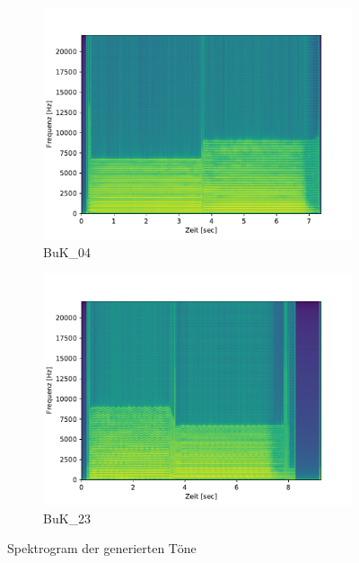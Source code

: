 \begin{figure}[H]
    \centering
    \begin{subfigure}{.5\textwidth}
        \centering
        \caption{BuK\_04}
        \includegraphics[width=\linewidth]{Figures/buk04_spectrogram}
    \end{subfigure}%
    \begin{subfigure}{.5\textwidth}
        \centering
        \caption{BuK\_23}
        \includegraphics[width=\linewidth]{Figures/buk23_spectrogram}
    \end{subfigure}
    \caption{Spektrogram der generierten Töne}
    \label{fig:spectrogram}
\end{figure}


